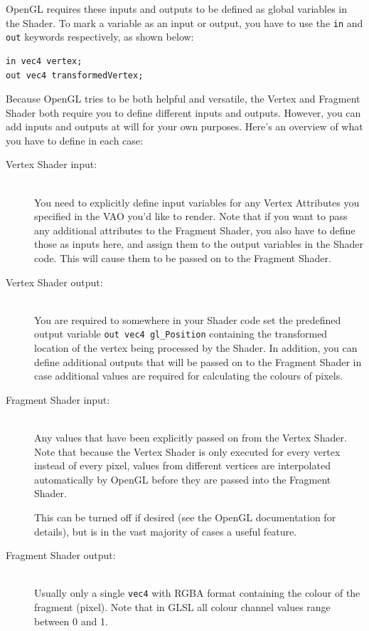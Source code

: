 OpenGL requires these inputs and outputs to be defined as global variables in the Shader. To mark a variable as an input or output, you have to use the \texttt{in} and \texttt{out} keywords respectively, as shown below:

\begin{verbatim}
in vec4 vertex;
out vec4 transformedVertex;
\end{verbatim}

Because OpenGL tries to be both helpful and versatile, the Vertex and Fragment Shader both require you to define different inputs and outputs. However, you can add inputs and outputs at will for your own purposes. Here's an overview of what you have to define in each case:

\begin{description}
  \item[Vertex Shader input:] \hfill \\
  You need to explicitly define input variables for any Vertex Attributes you specified in the VAO you'd like to render. Note that if you want to pass any additional attributes to the Fragment Shader, you also have to define those as inputs here, and assign them to the output variables in the Shader code. This will cause them to be passed on to the Fragment Shader.
  \item[Vertex Shader output:] \hfill \\ 
  You are required to somewhere in your Shader code set the predefined output variable \texttt{out vec4 gl_Position} containing the transformed location of the vertex being processed by the Shader. In addition, you can define additional outputs that will be passed on to the Fragment Shader in case additional values are required for calculating the colours of pixels.
  \item[Fragment Shader input:] \hfill \\
  Any values that have been explicitly passed on from the Vertex Shader. Note that because the Vertex Shader is only executed for every vertex instead of every pixel, values from different vertices are interpolated automatically by OpenGL before they are passed into the Fragment Shader.

  This can be turned off if desired (see the OpenGL documentation for details), but is in the vast majority of cases a useful feature.
  \item[Fragment Shader output:] \hfill \\ 
  Usually only a single \texttt{vec4} with RGBA format containing the colour of the fragment (pixel). Note that in GLSL all colour channel values range between 0 and 1. 
\end{description}

